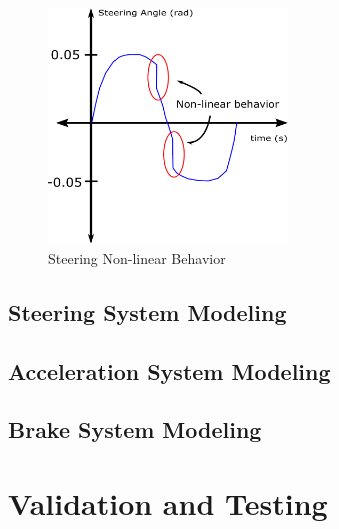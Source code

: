 \documentclass[journal,twoside,web]{ieeecolor}
\begin{document}
\begin{figure}[htbp]
    \centering
    \captionsetup{justification=centering}
    \includegraphics[width=2.5in]{figs/inkscape/nonlinearBehavior}
    \caption{Steering Non-linear Behavior}
    \label{fig:nonlinGraph}
\end{figure}

\subsection{Steering System Modeling}


\subsection{Acceleration System Modeling}


\subsection{Brake System Modeling}






\section{Validation and Testing} \label{sec:simresults}


\end{document}
